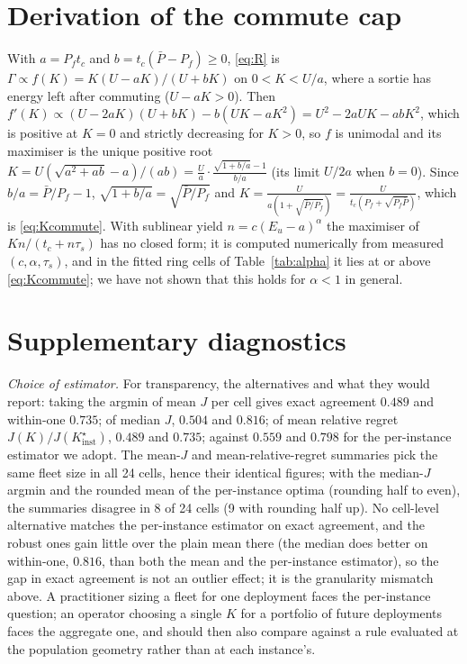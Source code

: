 \documentclass[journal,outdir=./]{IEEEtran}
\newcommand{\Pbar}{\bar{P}}
\newcommand{\Pf}{P_{f}}
\newcommand{\Eu}{E_{u}}
\newcommand{\Gam}{\Gamma}
\begin{document}
\section{Derivation of the commute cap}\label{app:commute}
With $a=\Pf t_c$ and $b=t_c(\Pbar-\Pf)\ge0$, \eqref{eq:R} is $\Gam\propto f(K)=K(U-aK)/(U+bK)$ on $0<K<U/a$, where a sortie has energy left after commuting ($U-aK>0$). Then $f'(K)\propto(U-2aK)(U+bK)-b(UK-aK^2)=U^2-2aUK-abK^2$, which is positive at $K=0$ and strictly decreasing for $K>0$, so $f$ is unimodal and its maximiser is the unique positive root $K=U(\sqrt{a^2+ab}-a)/(ab)=\frac{U}{a}\cdot\frac{\sqrt{1+b/a}-1}{b/a}$ (its limit $U/2a$ when $b=0$). Since $b/a=\Pbar/\Pf-1$, $\sqrt{1+b/a}=\sqrt{\Pbar/\Pf}$ and $K=\frac{U}{a(1+\sqrt{\Pbar/\Pf})}=\frac{U}{t_c(\Pf+\sqrt{\Pf\Pbar})}$, which is \eqref{eq:Kcommute}. With sublinear yield $n=c(\Eu-a)^{\alpha}$ the maximiser of $Kn/(t_c+n\tau_s)$ has no closed form; it is computed numerically from measured $(c,\alpha,\tau_s)$, and in the fitted ring cells of Table~\ref{tab:alpha} it lies at or above \eqref{eq:Kcommute}; we have not shown that this holds for $\alpha<1$ in general.

\section{Supplementary diagnostics}\label{app:diag}
\textit{Choice of estimator.} For transparency, the alternatives and what they would report: taking the argmin of mean $J$ per cell gives exact agreement $0.489$ and within-one $0.735$; of median $J$, $0.504$ and $0.816$; of mean relative regret $J(K)/J(K^{\star}_{\mathrm{inst}})$, $0.489$ and $0.735$; against $0.559$ and $0.798$ for the per-instance estimator we adopt. The mean-$J$ and mean-relative-regret summaries pick the same fleet size in all 24 cells, hence their identical figures; with the median-$J$ argmin and the rounded mean of the per-instance optima (rounding half to even), the summaries disagree in 8 of 24 cells (9 with rounding half up). No cell-level alternative matches the per-instance estimator on exact agreement, and the robust ones gain little over the plain mean there (the median does better on within-one, $0.816$, than both the mean and the per-instance estimator), so the gap in exact agreement is not an outlier effect; it is the granularity mismatch above. A practitioner sizing a fleet for one deployment faces the per-instance question; an operator choosing a single $K$ for a portfolio of future deployments faces the aggregate one, and should then also compare against a rule evaluated at the population geometry rather than at each instance's.
\end{document}

